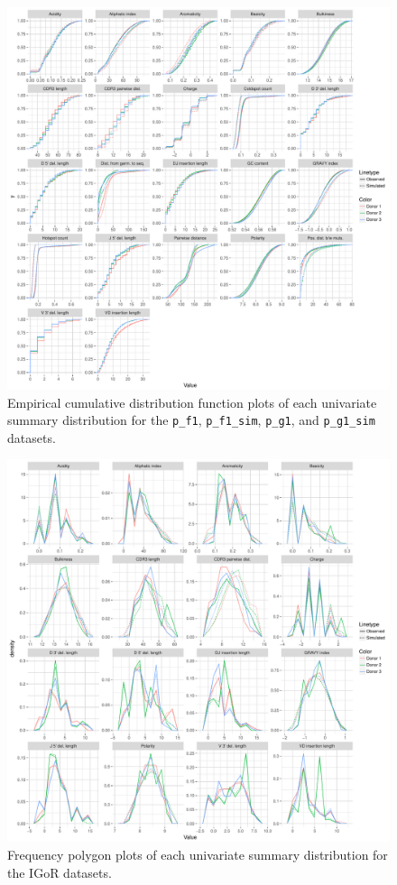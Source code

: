 \documentclass{article}
\begin{document}
\begin{figure}
    \includegraphics[width=\linewidth]{Figures/PartisScores/partis_ecdf.pdf}
    \caption{Empirical cumulative distribution function plots of each univariate summary distribution for the \texttt{p\_f1}, \texttt{p\_f1\_sim}, \texttt{p\_g1}, and \texttt{p\_g1\_sim} datasets.}
    \label{fig:PartisECDFs}
\end{figure}

\begin{figure}
    \includegraphics[width=\linewidth]{Figures/IgorScores/igor_freqpoly.pdf}
    \caption{Frequency polygon plots of each univariate summary distribution for the IGoR datasets.}
    \label{fig:IgorFreqPolys}
\end{figure}
\end{document}
